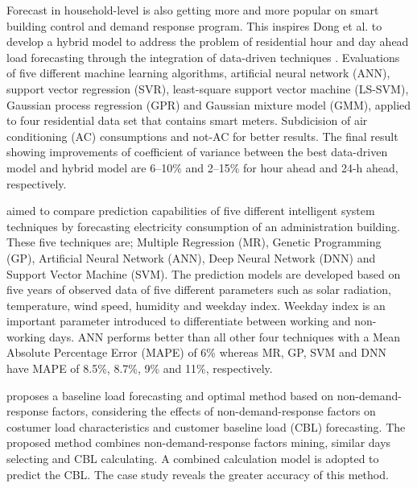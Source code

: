 Forecast in household-level is also getting more and more popular on smart building control and demand response program.
This inspires Dong et al. to develop a hybrid model to address the problem of residential hour and day ahead load forecasting through the integration of data-driven techniques \cite{DONG2016341}.
Evaluations of five different machine learning algorithms, artificial neural network (ANN), support vector regression (SVR), least-square support vector machine (LS-SVM), Gaussian process regression (GPR) and Gaussian mixture model (GMM), applied to four residential data set that contains smart meters.
Subdicision of air conditioning (AC) consumptions and not-AC for better results.
The final result showing improvements of coefficient of variance between the best data-driven model and hybrid model are 6–10\% and 2–15\% for hour ahead and 24-h ahead, respectively.

\cite{AMBER2018886} aimed to compare prediction capabilities of five different intelligent system techniques by forecasting electricity consumption of an administration building.
These five techniques are; Multiple Regression (MR), Genetic Programming (GP), Artificial Neural Network (ANN), Deep Neural Network (DNN) and Support Vector Machine (SVM). 
The prediction models are developed based on five years of observed data of five different parameters such as solar radiation, temperature, wind speed, humidity and weekday index.
Weekday index is an important parameter introduced to differentiate between working and non-working days.
ANN performs better than all other four techniques with a Mean Absolute Percentage Error (MAPE) of 6\% whereas MR, GP, SVM and DNN have MAPE of 8.5\%, 8.7\%, 9\% and 11\%, respectively.

\cite{7576207} proposes a baseline load forecasting and optimal method based on non-demand-response factors, considering the effects of non-demand-response factors on costumer load characteristics and customer baseline load (CBL) forecasting.
The proposed method combines non-demand-response factors mining, similar days selecting and CBL calculating.
A combined calculation model is adopted to predict the CBL.
The case study reveals the greater accuracy of this method.

